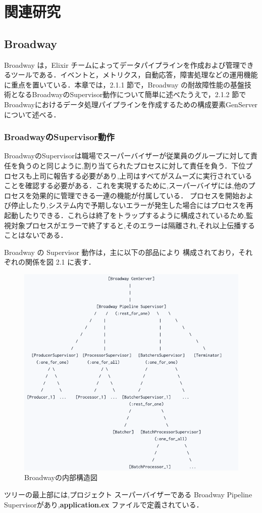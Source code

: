 \documentclass[a4paper]{jreport}	%
\begin{document}
\chapter{関連研究}
\section{Broadway}
Broadway は，Elixir チームによってデータパイプラインを作成および管理できるツールである．イベントと，メトリクス，自動応答，障害処理などの運用機能に重点を置いている\cite{D}．本章では，2.1.1 節で，Broadway の耐故障性能の基盤技術となるBroadwayのSupervisor動作について簡単に述べたうえで，2.1.2 節で Broadwayにおけるデータ処理パイプラインを作成するための構成要素GenServerについて述べる．
\subsection{BroadwayのSupervisor動作}
BroadwayのSupervisorは職場でスーパーバイザーが従業員のグループに対して責任を負うのと同じように,割り当てられたプロセスに対して責任を負う．下位プロセスも上司に報告する必要があり,上司はすべてがスムーズに実行されていることを確認する必要がある．これを実現するために,スーパーバイザには,他のプロセスを効果的に管理できる一連の機能が付属している． プロセスを開始および停止したり,システム内で予期しないエラーが発生した場合にはプロセスを再起動したりできる．これらは終了をトラップするように構成されているため,監視対象プロセスがエラーで終了すると,そのエラーは隔離され,それ以上伝播することはないである． 

Broadway の Supervisor 動作は，主に以下の部品により 構成されており，それぞれの関係を図 2.1 に表す．
\begin{figure}[H]
\vspace{11cm}
\begin{center}
\hspace{-13cm}
\includegraphics[scale=0.55]{ja/f2.png}
\end{center}
\caption{Broadwayの内部構造図}
\end{figure}
ツリーの最上部には,プロジェクト スーパーバイザーである Broadway Pipeline Supervisorがあり,\textbf{application.ex} ファイルで定義されている．
\end{document}
